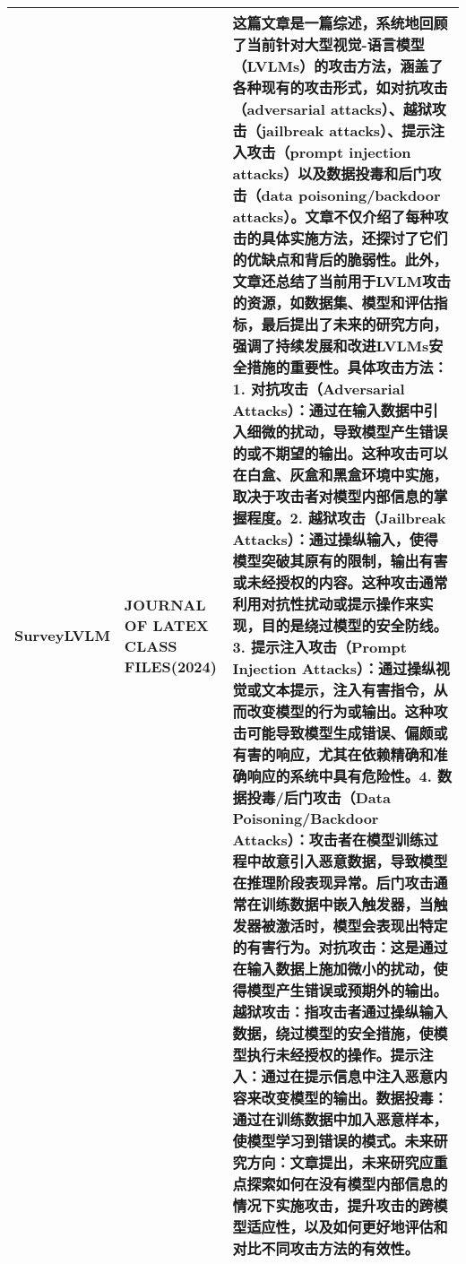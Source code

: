 \documentclass[lettersize,journal]{IEEEtran}
\begin{document}
\begin{longtable}{|p{3.5cm}|p{2cm}|p{10.5cm}|}
    SurveyLVLM\cite{defense04} & JOURNAL OF LATEX CLASS FILES(2024) & 这篇文章是一篇综述，系统地回顾了当前针对大型视觉-语言模型（LVLMs）的攻击方法，涵盖了各种现有的攻击形式，如对抗攻击（adversarial attacks）、越狱攻击（jailbreak attacks）、提示注入攻击（prompt injection attacks）以及数据投毒和后门攻击（data poisoning/backdoor attacks）。文章不仅介绍了每种攻击的具体实施方法，还探讨了它们的优缺点和背后的脆弱性。此外，文章还总结了当前用于LVLM攻击的资源，如数据集、模型和评估指标，最后提出了未来的研究方向，强调了持续发展和改进LVLMs安全措施的重要性。具体攻击方法：1. 对抗攻击（Adversarial Attacks）：通过在输入数据中引入细微的扰动，导致模型产生错误的或不期望的输出。这种攻击可以在白盒、灰盒和黑盒环境中实施，取决于攻击者对模型内部信息的掌握程度。2. 越狱攻击（Jailbreak Attacks）：通过操纵输入，使得模型突破其原有的限制，输出有害或未经授权的内容。这种攻击通常利用对抗性扰动或提示操作来实现，目的是绕过模型的安全防线。3. 提示注入攻击（Prompt Injection Attacks）：通过操纵视觉或文本提示，注入有害指令，从而改变模型的行为或输出。这种攻击可能导致模型生成错误、偏颇或有害的响应，尤其在依赖精确和准确响应的系统中具有危险性。4. 数据投毒/后门攻击（Data Poisoning/Backdoor Attacks）：攻击者在模型训练过程中故意引入恶意数据，导致模型在推理阶段表现异常。后门攻击通常在训练数据中嵌入触发器，当触发器被激活时，模型会表现出特定的有害行为。对抗攻击：这是通过在输入数据上施加微小的扰动，使得模型产生错误或预期外的输出。越狱攻击：指攻击者通过操纵输入数据，绕过模型的安全措施，使模型执行未经授权的操作。提示注入：通过在提示信息中注入恶意内容来改变模型的输出。数据投毒：通过在训练数据中加入恶意样本，使模型学习到错误的模式。未来研究方向：文章提出，未来研究应重点探索如何在没有模型内部信息的情况下实施攻击，提升攻击的跨模型适应性，以及如何更好地评估和对比不同攻击方法的有效性。 \\ \hline

\end{longtable}
\end{document}
